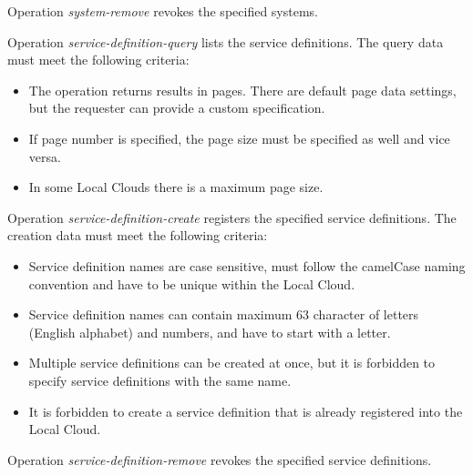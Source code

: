 \documentclass[a4paper]{arrowhead}
\begin{document}

Operation \textit{system-remove} revokes the specified systems.


Operation  \textit{service-definition-query} lists the service definitions. The query data must meet the following criteria:

\begin{itemize}
    \item The operation returns results in pages. There are default page data settings, but the requester can provide a custom specification.
    \item If page number is specified, the page size must be specified as well and vice versa.
    \item In some Local Clouds there is a maximum page size.
\end{itemize}


Operation \textit{service-definition-create} registers the specified service definitions. The creation data must meet the following criteria:

\begin{itemize}
    \item Service definition names are case sensitive, must follow the camelCase naming convention and have to be unique within the Local Cloud.
    \item Service definition names can contain maximum 63 character of letters (English alphabet) and numbers, and have to start with a letter.
    \item Multiple service definitions can be created at once, but it is forbidden to specify service definitions with the same name.
    \item It is forbidden to create a service definition that is already registered into the Local Cloud.
\end{itemize}


Operation \textit{service-definition-remove} revokes the specified service definitions.

\end{document}
